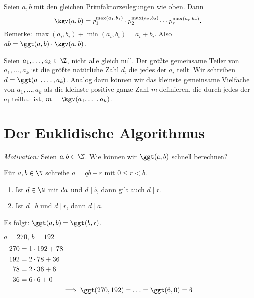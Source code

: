 \begin{rem*}
	Seien $a,b$ mit den gleichen Primfaktorzerlegungen wie oben. Dann
	\[ \kgv(a,b) = p_1^{\max(a_1,b_1)} \cdot p_2^{\max(a_2,b_2)} \dotsm p_r^{\max(a_r,b_r)}. \]
	Bemerke: $\max(a_i,b_i) + \min(a_i,b_i) = a_i + b_i$. Also $ab = \ggt(a,b) \cdot \kgv(a,b)$.
\end{rem*}

\begin{defn*}
	Seien \( a_1,\dotsc,a_k \in \Z \), nicht alle gleich null. Der größte gemeinsame Teiler von \( a_1,\dotsc,a_k \) ist die größte natürliche Zahl $d$, die jedes der $a_i$ teilt. Wir schreiben \( d = \ggt(a_1,\dotsc,a_k) \). Analog dazu können wir das kleinste gemeinsame Vielfache von $a_1,\dotsc, a_k$ als die kleinste positive ganze Zahl $m$ definieren, die durch jedes der $a_i$ teilbar ist, $m = \kgv(a_1,\dotsc,a_k)$.
\end{defn*}

\section*{Der Euklidische Algorithmus}

\emph{Motivation:} Seien $a,b \in \N$. Wie können wir $\ggt(a,b)$ schnell berechnen?

\begin{rem*}
	Für $a,b \in \N$ schreibe $a = qb + r$ mit $0 \leq r < b$.
	\begin{enumerate}[label={\roman*})]
		\item Ist $d \in \N$ mit $d \mit a$ und $d \mid b$, dann gilt auch $d \mid r$.
		\item Ist $d \mid b$ und $d \mid r$, dann $d \mid a$.
	\end{enumerate}
	Es folgt: $\ggt(a,b) = \ggt(b,r)$.
\end{rem*}

\begin{exmp*}
	$a = 270,\ b = 192$
	\begin{align*}
		270 &= 1 \cdot 192 + 78\\
		192 &= 2 \cdot 78 + 36\\
		78 &= 2 \cdot 36 + 6\\
		36 &= 6 \cdot 6 + 0\\
		\noalign{\centering $\implies \ggt(270,192) = \dotsc = \ggt(6,0) = 6$}
	\end{align*}
\end{exmp*}

